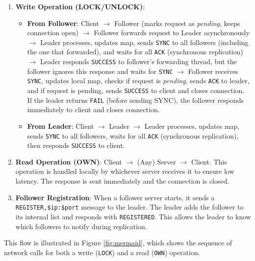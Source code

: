 \documentclass[a4paper,11pt]{article}
\begin{document}
\begin{enumerate}
    \item \textbf{Write Operation (LOCK/UNLOCK)}: 
    \begin{itemize}
        \item \textbf{From Follower}: Client $\rightarrow$ Follower (marks request as \emph{pending}, keeps connection open) $\rightarrow$ Follower forwards request to Leader asynchronously $\rightarrow$ Leader processes, updates map, sends \texttt{SYNC} to all followers (including the one that forwarded), and waits for all \texttt{ACK} (synchronous replication) $\rightarrow$ Leader responds \texttt{SUCCESS} to follower's forwarding thread, but the follower ignores this response and waits for \texttt{SYNC} $\rightarrow$ Follower receives \texttt{SYNC}, updates local map, checks if request is \emph{pending}, sends \texttt{ACK} to leader, and if request is pending, sends \texttt{SUCCESS} to client and closes connection. If the leader returns \texttt{FAIL} (before sending SYNC), the follower responds immediately to client and closes connection.
        \item \textbf{From Leader}: Client $\rightarrow$ Leader $\rightarrow$ Leader processes, updates map, sends \texttt{SYNC} to all followers, waits for all \texttt{ACK} (synchronous replication), then responds \texttt{SUCCESS} to client.
    \end{itemize}
    \item \textbf{Read Operation (OWN)}: Client $\rightarrow$ (Any) Server $\rightarrow$ Client. This operation is handled locally by whichever server receives it to ensure low latency. The response is sent immediately and the connection is closed.
    \item \textbf{Follower Registration}: When a follower server starts, it sends a \texttt{REGISTER,\$ip:\$port} message to the leader. The leader adds the follower to its internal list and responds with \texttt{REGISTERED}. This allows the leader to know which followers to notify during replication.
\end{enumerate}

This flow is illustrated in Figure \ref{fig:mermaid}, which shows the sequence of network calls for both a write (\texttt{LOCK}) and a read (\texttt{OWN}) operation.
\end{document}
